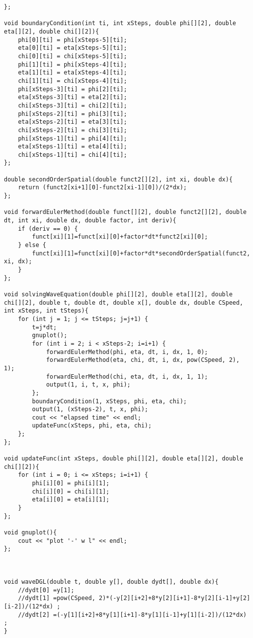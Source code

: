 \documentclass[10pt,fleqn,reqno,a4paper]{article}
\begin{document}
\begin{verbatim}
};

void boundaryCondition(int ti, int xSteps, double phi[][2], double eta[][2], double chi[][2]){
    phi[0][ti] = phi[xSteps-5][ti];
    eta[0][ti] = eta[xSteps-5][ti];
    chi[0][ti] = chi[xSteps-5][ti];
    phi[1][ti] = phi[xSteps-4][ti];
    eta[1][ti] = eta[xSteps-4][ti];
    chi[1][ti] = chi[xSteps-4][ti];
    phi[xSteps-3][ti] = phi[2][ti];
    eta[xSteps-3][ti] = eta[2][ti];
    chi[xSteps-3][ti] = chi[2][ti];
    phi[xSteps-2][ti] = phi[3][ti];
    eta[xSteps-2][ti] = eta[3][ti];
    chi[xSteps-2][ti] = chi[3][ti];
    phi[xSteps-1][ti] = phi[4][ti];
    eta[xSteps-1][ti] = eta[4][ti];
    chi[xSteps-1][ti] = chi[4][ti];
};

double secondOrderSpatial(double funct2[][2], int xi, double dx){
    return (funct2[xi+1][0]-funct2[xi-1][0])/(2*dx);
};

void forwardEulerMethod(double funct[][2], double funct2[][2], double dt, int xi, double dx, double factor, int deriv){
    if (deriv == 0) {
        funct[xi][1]=funct[xi][0]+factor*dt*funct2[xi][0];
    } else {
        funct[xi][1]=funct[xi][0]+factor*dt*secondOrderSpatial(funct2, xi, dx);
    }
};

void solvingWaveEquation(double phi[][2], double eta[][2], double chi[][2], double t, double dt, double x[], double dx, double CSpeed, int xSteps, int tSteps){
    for (int j = 1; j <= tSteps; j=j+1) {
        t=j*dt;
        gnuplot();
        for (int i = 2; i < xSteps-2; i=i+1) {
            forwardEulerMethod(phi, eta, dt, i, dx, 1, 0);
            forwardEulerMethod(eta, chi, dt, i, dx, pow(CSpeed, 2), 1);
            forwardEulerMethod(chi, eta, dt, i, dx, 1, 1);
            output(1, i, t, x, phi);
        };
        boundaryCondition(1, xSteps, phi, eta, chi);
        output(1, (xSteps-2), t, x, phi);
        cout << "elapsed time" << endl;
        updateFunc(xSteps, phi, eta, chi);
    };
};

void updateFunc(int xSteps, double phi[][2], double eta[][2], double chi[][2]){
    for (int i = 0; i <= xSteps; i=i+1) {
        phi[i][0] = phi[i][1];
        chi[i][0] = chi[i][1];
        eta[i][0] = eta[i][1];
	}
};

void gnuplot(){
    cout << "plot '-' w l" << endl;
};



void waveDGL(double t, double y[], double dydt[], double dx){
    //dydt[0] =y[1];
    //dydt[1] =pow(CSpeed, 2)*(-y[2][i+2]+8*y[2][i+1]-8*y[2][i-1]+y[2][i-2])/(12*dx) ;
    //dydt[2] =(-y[1][i+2]+8*y[1][i+1]-8*y[1][i-1]+y[1][i-2])/(12*dx) ;
}


\end{verbatim}
\end{document}
